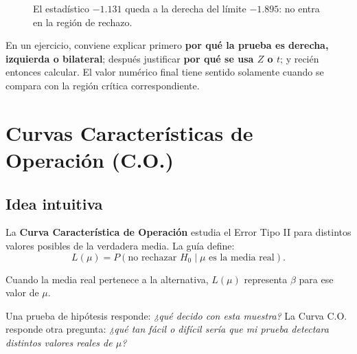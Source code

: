 \documentclass[11pt,a4paper]{article}
\begin{document}
\begin{figure}[H]
\centering
{}
\caption{El estadístico $-1.131$ queda a la derecha del límite $-1.895$: no entra en la región de rechazo.}
\end{figure}

\begin{oral}
En un ejercicio, conviene explicar primero \textbf{por qué la prueba es derecha, izquierda o bilateral}; después justificar \textbf{por qué se usa $Z$ o $t$}; y recién entonces calcular. El valor numérico final tiene sentido solamente cuando se compara con la región crítica correspondiente.
\end{oral}

\section{Curvas Características de Operación (C.O.)}

\subsection{Idea intuitiva}

La \textbf{Curva Característica de Operación} estudia el Error Tipo II para distintos valores posibles de la verdadera media. La guía define:
\[
L(\mu)=P(\text{no rechazar }H_0\mid \mu\text{ es la media real}).
\]

Cuando la media real pertenece a la alternativa, $L(\mu)$ representa $\beta$ para ese valor de $\mu$.

\begin{ideaclave}
Una prueba de hipótesis responde: \emph{¿qué decido con esta muestra?} La Curva C.O. responde otra pregunta: \emph{¿qué tan fácil o difícil sería que mi prueba detectara distintos valores reales de $\mu$?}
\end{ideaclave}
\end{document}
